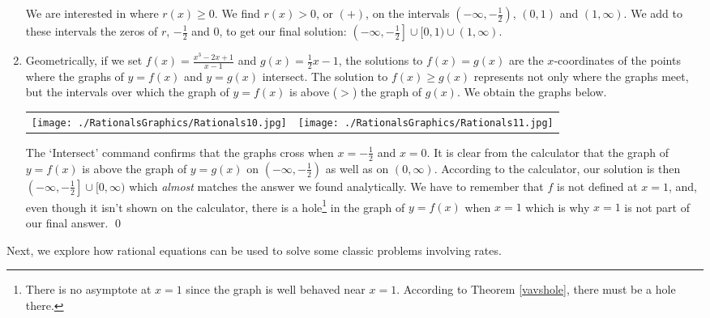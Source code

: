 \begin{ex}
\begin{enumerate}
\begin{center}
\end{center}

We are interested in where $r(x) \geq 0$.  We find $r(x) > 0$, or $(+)$, on the intervals $\left(-\infty, -\frac{1}{2}\right)$, $(0,1)$ and $(1, \infty)$.  We add to these intervals the zeros of $r$, $-\frac{1}{2}$ and $0$, to get our final solution:  $\left( - \infty, -\frac{1}{2} \right] \cup [0,1) \cup (1, \infty)$.

\item  Geometrically, if we set $f(x) = \frac{x^3-2x+1}{x-1}$ and $g(x) = \frac{1}{2} x -1$, the solutions to $f(x)=g(x)$ are the $x$-coordinates of the points where the graphs of $y=f(x)$ and $y=g(x)$ intersect.  The solution to $f(x) \geq g(x)$ represents not only where the graphs meet, but the intervals over which the graph of $y=f(x)$ is above ($>$) the graph of $g(x)$. We obtain the graphs below.  

\begin{center}

\begin{tabular}{cc}

\texttt{[image: ./RationalsGraphics/Rationals10.jpg]} \hspace{0.75in} & \texttt{[image: ./RationalsGraphics/Rationals11.jpg]} \\


\end{tabular}
\end{center} 

The `Intersect' command confirms that the graphs cross when $x=-\frac{1}{2}$ and $x=0$.  It is clear from the calculator that the graph of $y=f(x)$ is above the graph of $y=g(x)$ on $\left(-\infty, -\frac{1}{2}\right)$ as well as on $(0,\infty)$.  According to the calculator, our solution is then $\left(-\infty, -\frac{1}{2}\right] \cup [0, \infty)$ which \textit{almost} matches the answer we found analytically.  We have to remember that $f$ is not defined at $x=1$, and, even though it isn't shown on the calculator, there is a hole\footnote{There is no asymptote at $x=1$ since the graph is well behaved near $x=1$.  According to Theorem \ref{vavshole}, there  must be a hole there.}  in the graph of $y=f(x)$ when $x=1$ which is why $x=1$ is not part of our final answer. \qed

\end{enumerate}
\end{ex}  

Next, we explore how rational equations can be used to solve some classic problems involving rates.

